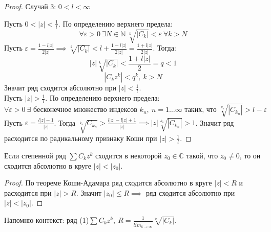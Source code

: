 \begin{theorem*}
\begin{proof}
        Случай 3: $0 < l < \infty$ \par
        Пусть $0 < \left| z \right| < \frac{1}{l}$. По определению верхнего предела:
        \[\forall \varepsilon > 0 \ \exists N \in \mathbb{N} \ \sqrt[k]{\left| C_k \right|} < \varepsilon \ \forall k > N\]
        Пусть $\varepsilon = \frac{1-  l\left| z \right|}{2 \left| z \right|} \implies \sqrt[k]{\left| C_k \right|} < l + \frac{1 - l\left| z \right|}{2 \left| z \right|} = \frac{1 + l\left| z \right|}{2 \left| z \right|}$. Тогда:
        \[\left| z \right|\sqrt[k]{\left| C_k\right|} < \frac{1 + l\left| z \right|}{2} = q < 1\]
        \[\left| C_k z^k \right| < q^k, \ k > N\]
        Значит ряд сходится абсолютно при $\left| z \right| < \frac{1}{l}$. \\
        Пусть $\left| z \right| > \frac{1}{l}$. По определению верхнего предела:
        \[ \forall \varepsilon > 0 \ \exists \text{ бесконечное множество индексов } k_n, \ n = 1 \hdots \infty \text{ таких, что } \sqrt[k_n]{\left| C_{k_n}\right|} > l - \varepsilon\]
        Пусть $\varepsilon = \frac{l\left| z \right| - 1}{\left| z \right|}$. Тогда $\sqrt[k_n]{C_{k_n}} > \frac{l\left| z \right| - l \left| z \right| + 1}{\left| z \right|} \implies \left| z \right|\sqrt[k_n]{\left| C_{k_n} \right|} > 1$. Значит ряд расходится по радикальному признаку Коши при $\left| z \right| > \frac{1}{l}$.
    \end{proof}
\end{theorem*}

\begin{theorem}
    Если степенной ряд $\sum C_k z^k$ сходится в некоторой $z_0 \in \mathbb{C}$ такой, что $z_0 \neq 0$, 
    то он сходится абсолютно в круге $\left| z \right| < \left| z_0 \right|$.

    \begin{proof}
        По теореме Коши-Адамара ряд сходится абсолютно в круге $\left| z \right| < R$ и расходится при $\left| z \right| > R$. 
        Значит $\left| z_0 \right| \leq R \implies $ ряд сходится абсолютно при $\left| z \right| < \left| z_0 \right|$.
    \end{proof}
\end{theorem}


Напомню контекст: ряд (1)$\sum C_k z^k, \ R = \frac{1}{\overline{lim}_{k \to \infty}} \sqrt[k]{\left| C_k\right|}$. 

